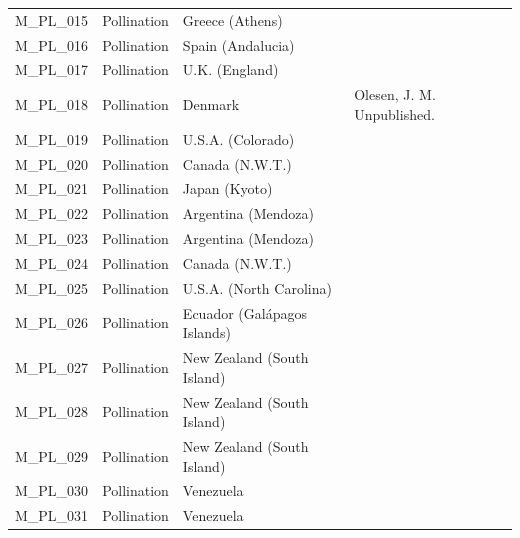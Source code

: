 \documentclass[12pt]{article}
\begin{document}
\begin{spacing}{1.5}
\begin{table}[!h]
\begin{center}
\begin{tabular}{|l l l m{8cm} |}
    M\_PL\_015  & Pollination & Greece (Athens) & \citet{Petanidou1991} \\
    M\_PL\_016  & Pollination & Spain (Andalucia) & \citet{Herrera1988} \\
    M\_PL\_017  & Pollination & U.K. (England) & \citet{Memmott2002} \\
    M\_PL\_018  & Pollination & Denmark & Olesen, J. M. Unpublished.  \\
    M\_PL\_019  & Pollination & U.S.A. (Colorado) & \citet{Inouye1988}  \\
    M\_PL\_020  & Pollination & Canada (N.W.T.) & \citet{Kevan1970} \\
    M\_PL\_021  & Pollination & Japan (Kyoto) & \citet{Kato1990}  \\
    M\_PL\_022  & Pollination & Argentina (Mendoza) & \citet{Medan2002} \\
    M\_PL\_023  & Pollination & Argentina (Mendoza) & \citet{Medan2002} \\
    M\_PL\_024  & Pollination & Canada (N.W.T.) & \citet{Mosquin1967} \\
    M\_PL\_025  & Pollination & U.S.A. (North Carolina) & \citet{Motten1982}  \\
    M\_PL\_026  & Pollination & Ecuador (Gal\'{a}pagos Islands) & \citet{McMullen1993}  \\
    M\_PL\_027  & Pollination & New Zealand (South Island) & \citet{Primack1983} \\
    M\_PL\_028  & Pollination & New Zealand (South Island) & \citet{Primack1983} \\
    M\_PL\_029  & Pollination & New Zealand (South Island) & \citet{Primack1983} \\
    M\_PL\_030  & Pollination & Venezuela & \citet{Ramirez1992} \\
    M\_PL\_031  & Pollination & Venezuela & \citet{Ramirez1989} \\
    \hline
    \end{tabular}
    \end{center}
    \end{table}

    \clearpage
    \newpage


\end{spacing}
\end{document}
